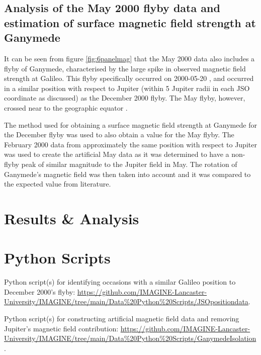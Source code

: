 \documentclass[11pt]{article}
\begin{document}
\subsection{Analysis of the May 2000 flyby data and estimation of surface magnetic field strength at Ganymede}
It can be seen from figure \ref{fig:6panelmag} that the May 2000 data also includes a flyby of Ganymede, characterised by the large spike in observed magnetic field strength at Galileo. This flyby specifically occurred on 2000-05-20 \cite{nasaflybys}, and occurred in a similar position with respect to Jupiter (within 5 Jupiter radii in each JSO coordinate as discussed) as the December 2000 flyby. The May flyby, however, crossed near to the geographic equator \cite{flybylines}.

The method used for obtaining a surface magnetic field strength at Ganymede for the December flyby was used to also obtain a value for the May flyby. The February 2000 data from approximately the same position with respect to Jupiter was used to create the artificial May data as it was determined to have a non-flyby peak of similar magnitude to the Jupiter field in May. The rotation of Ganymede's magnetic field was then taken into account and it was compared to the expected value from literature.

\section{Results \& Analysis}
\label{sec:result}

\newpage



\newpage
\appendix
\section{Python Scripts}
\label{app:scripts}
Python script(s) for identifying occasions with a similar Galileo position to December 2000's flyby: \url{https://github.com/IMAGINE-Lancaster-University/IMAGINE/tree/main/Data\%20Python\%20Scripts/JSOpositiondata}.

\noindent Python script(s) for constructing artificial magnetic field data and removing Jupiter's magnetic field contribution: \url{https://github.com/IMAGINE-Lancaster-University/IMAGINE/tree/main/Data\%20Python\%20Scripts/GanymedeIsolation}.
\end{document}
